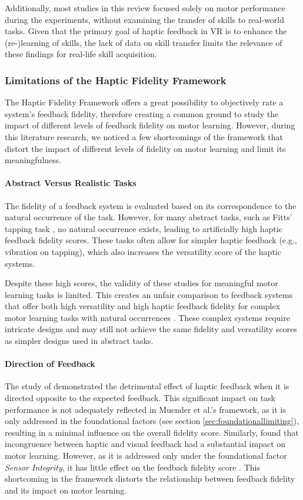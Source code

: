 Additionally, most studies in this review focused solely on motor performance during the experiments, without examining the transfer of skills to real-world tasks. Given that the primary goal of haptic feedback in VR is to enhance the (re-)learning of skills, the lack of data on skill transfer limits the relevance of these findings for real-life skill acquisition.


\subsubsection{Limitations of the Haptic Fidelity Framework}
The Haptic Fidelity Framework offers a great possibility to objectively rate a system's feedback fidelity, therefore creating a common ground to study the impact of different levels of feedback fidelity on motor learning. However, during this literature research, we noticed a few shortcomings of the framework that distort the impact of different levels of fidelity on motor learning and limit its meaningfulness.

\paragraph{Abstract Versus Realistic Tasks}
The fidelity of a feedback system is evaluated based on its correspondence to the natural occurrence of the task. However, for many abstract tasks, such as Fitts' tapping task \cite{Fitts1954TheMovement}, no natural occurrence exists, leading to artificially high haptic feedback fidelity scores. These tasks often allow for simpler haptic feedback (e.g., vibration on tapping), which also increases the versatility score of the haptic systems. 

Despite these high scores, the validity of these studies for meaningful motor learning tasks is limited. This creates an unfair comparison to feedback systems that offer both high versatility and high haptic feedback fidelity for complex motor learning tasks with natural occurrences \cite{LeeY2019, LiuH2019, Oezen2022}. These complex systems require intricate designs and may still not achieve the same fidelity and versatility scores as simpler designs used in abstract tasks.

\paragraph{Direction of Feedback}
The study of \cite{Macuga2019} demonstrated the detrimental effect of haptic feedback when it is directed opposite to the expected feedback. This significant impact on task performance is not adequately reflected in Muender et al.'s framework, as it is only addressed in the foundational factors (see section \ref{sec:foundationallimiting}), resulting in a minimal influence on the overall fidelity score. Similarly, \cite{Mohanty2023} found that incongruence between haptic and visual feedback had a substantial impact on motor learning. However, as it is addressed only under the foundational factor \textit{Sensor Integrity}, it has little effect on the feedback fidelity score \cite{Muender2022HapticReality}. This shortcoming in the framework distorts the relationship between feedback fidelity and its impact on motor learning.


